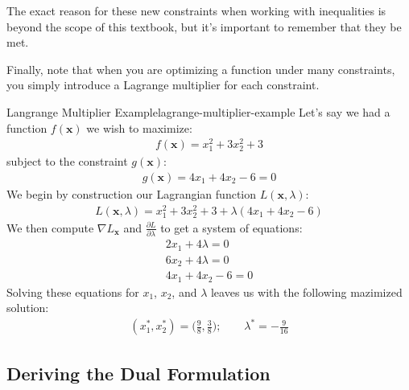 \begin{warning}
    The exact reason for these new constraints when working with inequalities is beyond the scope of this textbook, but it's important to remember that they be met.
\end{warning}

Finally, note that when you are optimizing a function under many constraints, you simply introduce a Lagrange multiplier for each constraint.

\begin{example}{Langrange Multiplier Example}{lagrange-multiplier-example}
	Let's say we had a function $f(\textbf{x})$ we wish to maximize:
	\begin{align*}
		f(\textbf{x}) = x_{1}^{2} + 3x_{2}^{2} + 3
	\end{align*}
	subject to the constraint $g(\textbf{x})$:
	\begin{align*}
		g(\textbf{x}) = 4x_{1} + 4x_{2} - 6 = 0
	\end{align*}
	We begin by construction our Lagrangian function $L(\textbf{x}, \lambda)$:
	\begin{align*}
		L(\textbf{x}, \lambda) = x_{1}^{2} + 3x_{2}^{2} + 3 + \lambda (4x_{1} + 4x_{2} - 6)
	\end{align*}
	We then compute $\nabla L_{\textbf{x}}$ and $\frac{\partial L}{\partial \lambda}$ to get a system of equations:
	\begin{align*}
		2x_{1} + 4\lambda = 0 \\
		6x_{2} + 4\lambda = 0 \\
		4x_{1} + 4x_{2} - 6 = 0
	\end{align*}
	Solving these equations for $x_{1}$, $x_{2}$, and $\lambda$ leaves us with the following mazimized solution:
	\begin{align*}
		(x_{1}^{*}, x_{2}^{*}) = \bigg(\frac{9}{8}, \frac{3}{8}\bigg); \qquad \lambda^{*} = -\frac{9}{16}
	\end{align*}
\end{example}

\fi

\subsection{Deriving the Dual Formulation}

